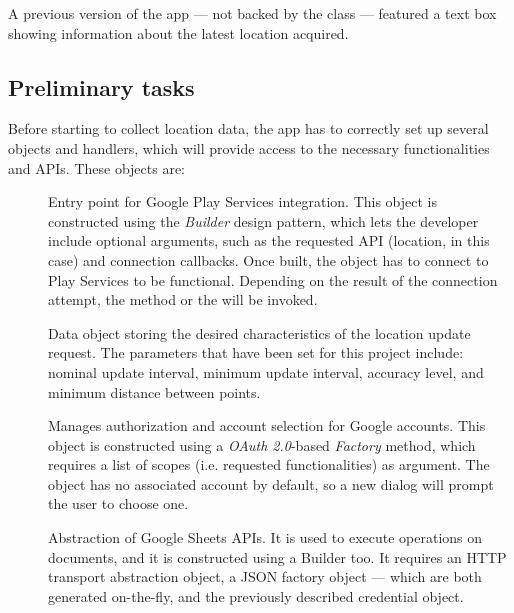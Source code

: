 
A previous version of the app --- not backed by the  class --- featured a text box showing information about the latest location acquired.


\subsection{Preliminary tasks}
Before starting to collect location data, the app has to correctly set up several objects and handlers, which will provide access to the necessary functionalities and APIs.
These objects are:
\begin{description}
	\item[] Entry point for Google Play Services integration. This object is constructed using the \emph{Builder} design pattern, which lets the developer include optional arguments, such as the requested API (location, in this case) and connection callbacks. Once built, the object has to connect to Play Services to be functional. Depending on the result of the connection attempt, the  method or the  will be invoked.
	\item[] Data object storing the desired characteristics of the location update request. The parameters that have been set for this project include: nominal update interval, minimum update interval, accuracy level, and minimum distance between points.
	\item[] Manages authorization and account selection for Google accounts. This object is constructed using a \emph{OAuth 2.0}-based \emph{Factory} method, which requires a list of scopes (i.e. requested functionalities) as argument. The object has no associated account by default, so a new dialog will prompt the user to choose one.
	\item[] Abstraction of Google Sheets APIs. It is used to execute operations on documents, and it is constructed using a Builder too. It requires an HTTP transport abstraction object, a JSON factory object --- which are both generated on-the-fly, and the previously described credential object.
\end{description}



